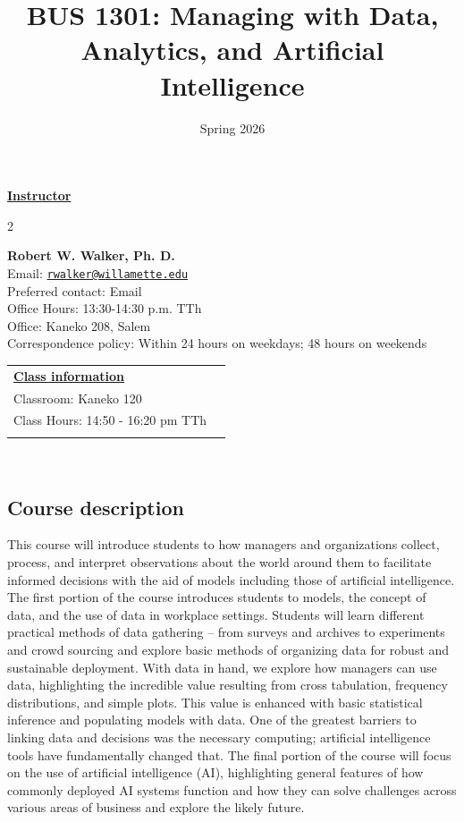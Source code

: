 \documentclass[11pt,]{article}
\title{BUS 1301: Managing with Data, Analytics, and Artificial
Intelligence}
\date{Spring 2026}
\begin{document}
  

		\maketitle
		
	
		\thispagestyle{firststyle}

\textbf{\underline{Instructor}}
\begin{multicols}{2}

  \textbf{Robert W. Walker, Ph. D.}\\
  Email: \href{mailto:rwalker@willamette.edu}{\nolinkurl{rwalker@willamette.edu}}\\
  Preferred contact: Email\\
  Office Hours: 13:30-14:30 p.m. TTh\\
  Office: Kaneko 208, Salem\\
  Correspondence policy: Within 24 hours on weekdays; 48 hours on
weekends\\
    \columnbreak
    
  \end{multicols}
	
\noindent \begin{tabular*}{\textwidth}{ @{\extracolsep{\fill}} lr @{\extracolsep{\fill}}}
\textbf{\underline{Class information}}\\
  Classroom: Kaneko 120\\
  Class Hours: 14:50 - 16:20 pm TTh\\
    \\
	\end{tabular*}\\


\vspace{2mm}


\subsection{Course description}\label{course-description}

This course will introduce students to how managers and organizations
collect, process, and interpret observations about the world around them
to facilitate informed decisions with the aid of models including those
of artificial intelligence. The first portion of the course introduces
students to models, the concept of data, and the use of data in
workplace settings. Students will learn different practical methods of
data gathering -- from surveys and archives to experiments and crowd
sourcing and explore basic methods of organizing data for robust and
sustainable deployment. With data in hand, we explore how managers can
use data, highlighting the incredible value resulting from cross
tabulation, frequency distributions, and simple plots. This value is
enhanced with basic statistical inference and populating models with
data. One of the greatest barriers to linking data and decisions was the
necessary computing; artificial intelligence tools have fundamentally
changed that. The final portion of the course will focus on the use of
artificial intelligence (AI), highlighting general features of how
commonly deployed AI systems function and how they can solve challenges
across various areas of business and explore the likely future.
\end{document}
